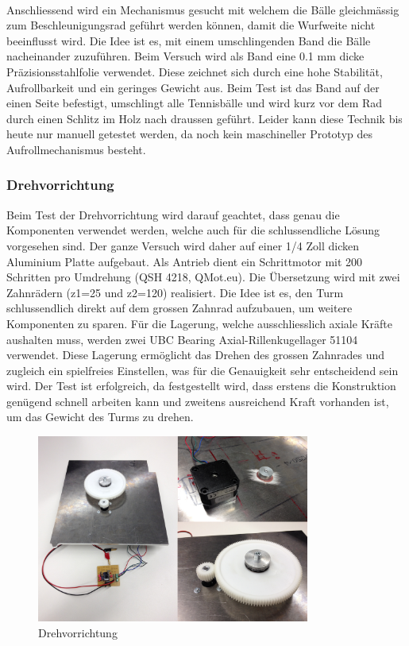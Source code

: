 \noindent
\\Anschliessend wird ein Mechanismus gesucht mit welchem die Bälle 
gleichmässig zum Beschleunigungsrad geführt werden können, damit die Wurfweite 
nicht beeinflusst wird. Die Idee ist es, mit einem umschlingenden Band die 
Bälle nacheinander zuzuführen. Beim Versuch wird als Band eine 0.1 mm dicke 
Präzisionsstahlfolie verwendet. Diese zeichnet sich durch eine hohe Stabilität, 
Aufrollbarkeit und ein geringes Gewicht aus. Beim Test ist das Band auf der 
einen Seite befestigt, umschlingt alle Tennisbälle und wird kurz vor dem Rad 
durch einen Schlitz im Holz nach draussen geführt. Leider kann diese Technik bis heute 
nur manuell getestet werden, da noch kein maschineller Prototyp des Aufrollmechanismus 
besteht. \\


\subsubsection{Drehvorrichtung}
Beim Test der Drehvorrichtung wird darauf geachtet, dass genau die Komponenten 
verwendet werden, welche auch für die schlussendliche Lösung vorgesehen sind. 
Der ganze Versuch wird daher auf einer 1/4 Zoll dicken Aluminium Platte 
aufgebaut. Als Antrieb dient ein Schrittmotor mit 200 Schritten pro Umdrehung 
(QSH 4218, QMot.eu). Die Übersetzung wird mit zwei Zahnrädern (z1=25 und z2=120) 
realisiert. Die Idee ist es, den Turm schlussendlich direkt auf dem grossen 
Zahnrad aufzubauen, um weitere Komponenten zu sparen. Für die Lagerung, welche 
ausschliesslich axiale Kräfte aushalten muss, werden zwei UBC Bearing 
Axial-Rillenkugellager 51104 verwendet. Diese Lagerung ermöglicht das Drehen 
des grossen Zahnrades und zugleich ein spielfreies Einstellen, was für die 
Genauigkeit sehr entscheidend sein wird.
Der Test ist erfolgreich, da festgestellt wird, dass erstens die Konstruktion 
genügend schnell arbeiten kann und zweitens ausreichend Kraft vorhanden ist, 
um das Gewicht des Turms zu drehen.

\begin{figure}[h!]          
	\centering             
	\includegraphics[width=0.8\textwidth]{fig/Drehvorrichtung.png}    
	\caption{Drehvorrichtung}
	
	\label{fig:Drehvorrichtung}
\end{figure}
\noindent



